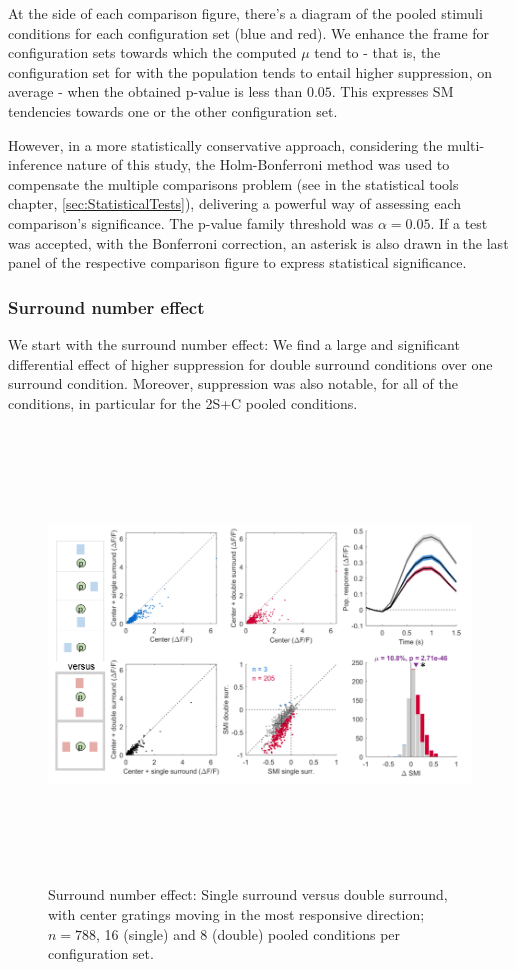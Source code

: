 At the side of each comparison figure, there's a diagram of the pooled stimuli conditions for each configuration set (blue and red). We enhance the frame for configuration sets towards which the computed $\mu$ tend to - that is, the configuration set for with the population tends to entail higher suppression, on average - when the obtained p-value is less than $0.05$. This expresses SM tendencies towards one or the other configuration set.

However, in a more statistically conservative approach, considering the multi-inference nature of this study, the Holm-Bonferroni method was used to compensate the multiple comparisons problem (see in the statistical tools chapter, \ref{sec:StatisticalTests}), delivering a powerful way of assessing each comparison's significance. The p-value family threshold was $\alpha=0.05$. If a test was accepted, with the Bonferroni correction, an asterisk is also drawn in the last panel of the respective comparison figure to express statistical significance.

\subsubsection{Surround number effect}

We start with the surround number effect: We find a large and significant differential effect of higher suppression for double surround conditions over one surround condition. Moreover, suppression was also notable, for all of the conditions, in particular for the 2S+C pooled conditions.

\begin{figure}[H] \centering \includegraphics[width=12cm,height=12cm,keepaspectratio]{Figures/7.Results/finalPopulation/sel/diagrams/1.png} 
\caption{Surround number effect: Single surround versus double surround, with center gratings moving in the most responsive direction; $n=788$, 16 (single) and 8 (double) pooled conditions per configuration set.} 
\end{figure}

